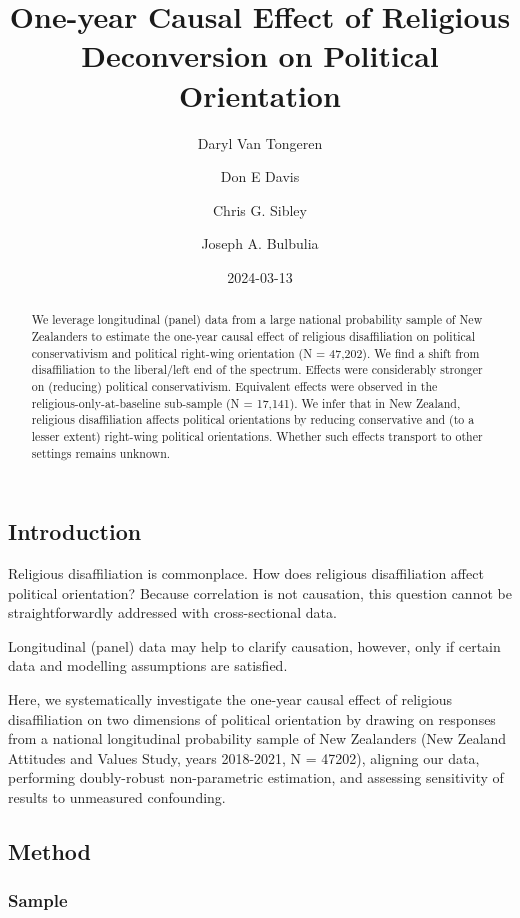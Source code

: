 \documentclass[
  singlecolumn]{article}
\title{One-year Causal Effect of Religious Deconversion on Political
Orientation}
\author{Daryl Van Tongeren \and Don E Davis \and Chris G.
Sibley \and Joseph A. Bulbulia}
\date{2024-03-13}
\begin{document}
\maketitle
\begin{abstract}
We leverage longitudinal (panel) data from a large national probability
sample of New Zealanders to estimate the one-year causal effect of
religious disaffiliation on political conservativism and political
right-wing orientation (N = 47,202). We find a shift from disaffiliation
to the liberal/left end of the spectrum. Effects were considerably
stronger on (reducing) political conservativism. Equivalent effects were
observed in the religious-only-at-baseline sub-sample (N = 17,141). We
infer that in New Zealand, religious disaffiliation affects political
orientations by reducing conservative and (to a lesser extent)
right-wing political orientations. Whether such effects transport to
other settings remains unknown.
\end{abstract}

\subsection{Introduction}\label{introduction}

Religious disaffiliation is commonplace. How does religious
disaffiliation affect political orientation? Because correlation is not
causation, this question cannot be straightforwardly addressed with
cross-sectional data.

Longitudinal (panel) data may help to clarify causation, however, only
if certain data and modelling assumptions are satisfied.

Here, we systematically investigate the one-year causal effect of
religious disaffiliation on two dimensions of political orientation by
drawing on responses from a national longitudinal probability sample of
New Zealanders (New Zealand Attitudes and Values Study, years 2018-2021,
N = 47202), aligning our data, performing doubly-robust non-parametric
estimation, and assessing sensitivity of results to unmeasured
confounding.

\subsection{Method}\label{method}

\subsubsection{Sample}\label{sample}
\end{document}
